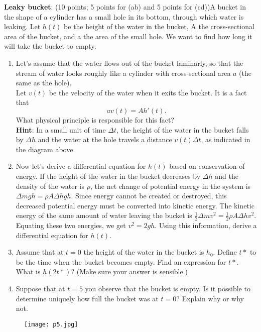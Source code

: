 \documentclass[11pt,letterpaper,boxed]{hmcpset}
\renewcommand{\v}[1]{\textbf{#1}}
\begin{document}
\begin{problem}[5]
\v{Leaky bucket}: (10 points; 5 points for (ab) and 5 points for (cd))A bucket in the shape of a cylinder has a small hole in its bottom, through which water is leaking. Let $h(t)$ be the height of the water in the bucket, A the cross-sectional area of the bucket, and a the area of the small hole. We want to find how long it will take the bucket to empty.
\begin{enumerate}
\item Let’s assume that the water flows out of the bucket laminarly, so that the stream of water looks roughly like a cylinder with cross-sectional area $a$ (the same as the hole).\\
Let $v(t)$ be the velocity of the water when it exits the bucket. It is a fact that
\[av(t) = A h'(t).\]
What physical principle is responsible for this fact?\\
\v{Hint}: In a small unit of time $\Delta t$, the height of the water in the bucket falls by $\Delta h$ and the water at the hole travels a distance $v(t)\Delta t$, as indicated in the diagram above.
\item Now let’s derive a differential equation for $h(t)$ based on conservation of energy. If the
height of the water in the bucket decreases by $\Delta h$ and the density of the water is $\rho $,
the net change of potential energy in the system is $\Delta mgh = \rho A\Delta hgh$. Since energy
cannot be created or destroyed, this decreased potential energy must be converted into
kinetic energy. The kinetic energy of the same amount of water leaving the bucket
is $\frac 12 \Delta m v^2 = \frac 12 \rho A \Delta h v^2$. Equating these two energies, we get $v^2 = 2gh$. Using this
information, derive a differential equation for $h(t)$.
\item Assume that at $t = 0$ the height of the water in the bucket is $h_0$. Define $t*$ to be the time when the bucket becomes empty. Find an expression for $t*$. What is $h(2t*)$? (Make sure your answer is sensible.)
\item Suppose that at $t = 5$ you observe that the bucket is empty. Is it possible to determine uniquely how full the bucket was at $t = 0$? Explain why or why not.
\end{enumerate}
\end{problem}
\begin{figure}[ht!]
\centering
\texttt{[image: p5.jpg]}
\end{figure}

\end{document}
